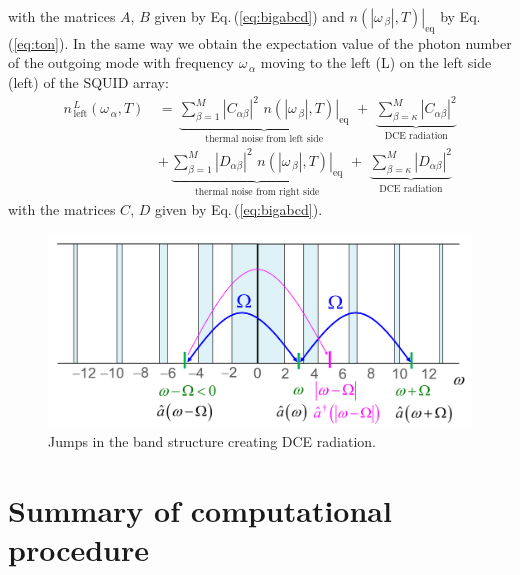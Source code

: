 %
with the matrices $A$, $B$ given by Eq.\,(\ref{eq:bigabcd}) and 
$\left. n(|\omega_{\,\beta}|, T) \right|_{\text{eq}}$ by Eq.\,(\ref{eq:ton}). 
In the same way we obtain the
expectation value of the photon number of the outgoing mode with frequency 
$\omega_{\,\alpha}$ moving to the left (L) on the left side (left) of the SQUID array:
%
\begin{equation} \label{eq:dce_left}
\begin{split}
n_{\,\text{left}}^{\,L}(\omega_{\,\alpha}, T) \, & = \,
\underbrace{\sum\limits_{\beta=1}^{M} \left|C_{\alpha \beta}\right|^2 \, \,
\left. n(|\omega_{\,\beta}|, T) \right|_{\text{eq}}}_{\text{thermal noise from left side}}
\, \, + \, \,
\underbrace{\sum\limits_{\beta=\kappa}^{M} \left|C_{\alpha \beta}\right|^2}_{\text{DCE radiation}} \\[4mm]
& + \, \underbrace{\sum\limits_{\beta=1}^{M} \left|D_{\alpha \beta}\right|^2 \, \,
\left. n(|\omega_{\,\beta}|, T) \right|_{\text{eq}}}_{\text{thermal noise from right side}}
\, \, + \, \,
\underbrace{\sum\limits_{\beta=\kappa}^{M} \left|D_{\alpha \beta}\right|^2}_{\text{DCE radiation}}
\end{split}
\end{equation}
%
with the matrices $C$, $D$ given by Eq.\,(\ref{eq:bigabcd}). 

\begin{figure}
    \includegraphics[width=1.0\textwidth, keepaspectratio]{figures/system/jump.png}
    \caption{Jumps in the band structure creating DCE radiation.}
    \label{fig:jump}
\end{figure}









\section{Summary of computational procedure}
\label{sec:summary}

